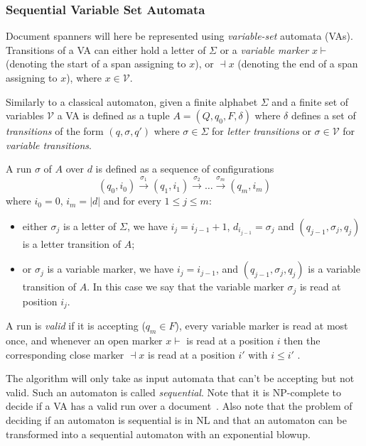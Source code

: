 \documentclass[12px]{article}
\begin{document}
      \subsubsection{Sequential Variable Set Automata}

        Document spanners will here be represented using \textit{variable-set}
        automata (VAs). Transitions of a VA can either hold a letter
        of $\Sigma$ or a \textit{variable marker} $x{\vdash}$ (denoting the
        start of a span assigning to $x$), or ${\dashv}x$ (denoting the end of
        a span assigning to $x$), where $x \in \mathcal{V}$.

        Similarly to a classical automaton, given a finite alphabet $\Sigma$
        and a finite set of variables $\mathcal{V}$ a VA is defined as a tuple
        $A = (Q, q_0, F, \delta)$ where $\delta$ defines a set of
        \textit{transitions} of the form $(q, \sigma, q')$ where $\sigma \in
        \Sigma$ for \textit{letter transitions} or $\sigma \in \mathcal{V}$ for
        \textit{variable transitions}.

        A run $\sigma$ of $A$ over $d$ is defined as a sequence of
        configurations
          \[ (q_0, i_0) \xrightarrow{\sigma_1} (q_1, i_1)
          \xrightarrow{\sigma_2} \ldots \xrightarrow{\sigma_m} (q_m, i_m) \]
        where $i_0 = 0$, $i_m = |d|$ and for every $1 \leq j \leq m$:
          \begin{itemize}
            \item either $\sigma_j$ is a letter of $\Sigma$, we have $i_j =
              i_{j-1} + 1$, $d_{i_{j-1}} = \sigma_j$ and $(q_{j-1}, \sigma_j,
              q_j)$ is a letter transition of $A$;
            \item or $\sigma_j$ is a variable marker, we have $i_j = i_{j-1}$,
              and $(q_{j-1}, \sigma_j, q_j)$ is a variable transition of $A$. In
              this case we say that the variable marker $\sigma_j$ is read at
              position $i_j$.
          \end{itemize}

        A run is \textit{valid} if it is accepting ($q_m \in F$), every
        variable marker is read at most once, and whenever an open marker $x
        \vdash$ is read at a position $i$ then the corresponding close marker
        $\dashv x$ is read at a position $i'$ with $i \leq i'$ .

        The algorithm will only take as input automata that can't be accepting
        but not valid. Such an automaton is called \textit{sequential}. Note
        that it is NP-complete to decide if a VA has a valid run over a
        document~\cite{freydenberger:LIPIcs:2017}. Also note that the problem
        of deciding if an automaton is sequential is in NL and that an
        automaton can be transformed into a sequential automaton with an
        exponential blowup.
\end{document}
